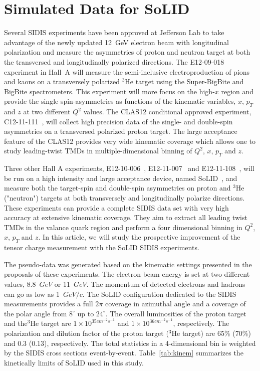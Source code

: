 \documentclass[twocolumn,showpacs,preprintnumbers,amsmath,amssymb,floatfix,prd]{revtex4}
\begin{document}
\section{Simulated Data for SoLID}
%
Several SIDIS experiments have been approved at Jefferson Lab to take advantage of the newly updated 12~GeV electron beam with longitudinal polarization and measure the asymmetries of proton and neutron target at both the transversed and longitudinally polarized directions. The  E12-09-018 experiment in Hall~A \cite{e1209018} will measure the semi-inclusive electroproduction of pions and kaons on a transversely polarized $\mathrm{^{3}He}$ target using the Super-BigBite and BigBite spectrometers. This experiment will more focus on the high-$x$ region and provide the single spin-asymmetries as functions of the kinematic variables, $x$, $p_{T}$ and $z$ at two different $Q^{2}$ values.   The CLAS12 conditional approved experiment, C12-11-111~\cite{c1211111}, will collect high precision data of the single- and double-spin asymmetries on a transversed polarized proton target. The large acceptance feature of the CLAS12 provides very wide  kinematic coverage which allows one to study  leading-twist TMDs in multiple-dimensional binning of $Q^{2}$, $x$, $p_{T}$ and $z$.

Three other Hall A experiments, E12-10-006~\cite{1210006}, E12-11-007~\cite{e1211007} and E12-11-108~\cite{e1211108}, will be run on a high intensity and large acceptance device, named SoLID~\cite{solid_pcdr}, and measure both the target-spin and double-spin asymmetries on proton and  $\mathrm{^{3}He}$ ("neutron") targets at both  transversely and longitudinally polarize directions. These experiments can provide a complete SIDIS data set with very high accuracy at extensive kinematic coverage. They aim to extract all leading twist TMDs in the valance quark region and perform a  four dimensional binning in $Q^{2}$, $x$, $p_{T}$ and $z$. In this article, we will study the prospective improvement of the tensor charge measurement  with the SoLID SIDIS experiments. 

The pseudo-data was generated based on the kinematic settings presented in the proposals of these experiments. The electron beam energy is set at two different values, 8.8~$GeV$ or 11~$GeV$. The momentum of detected electrons and hadrons can go as low as 1~$GeV/c$. The SoLID configuration dedicated to the SIDIS measurements provides a full $2\pi$ coverage in azimuthal angle and a coverage of the polar angle from $8^{\circ}$ up to $24^{\circ}$.  The overall luminosities of the proton target and the$\mathrm{^{3}He}$ target are  $1\times 10^{35 cm^{-2}s^{-1}}$ and $1\times 10^{36 cm^{-2}s^{-1}}$, respectively.  The polarization and dilution factor of the proton target ($\mathrm{^{3}He}$ target) are 65\% (70\%) and 0.3 (0.13), respectively. The total statistics in a 4-dimensional bin is weighted by the SIDIS cross sections event-by-event. Table~\ref{tab:kinem} summarizes the kinetically limits of SoLID used in this study.
 
\end{document}
